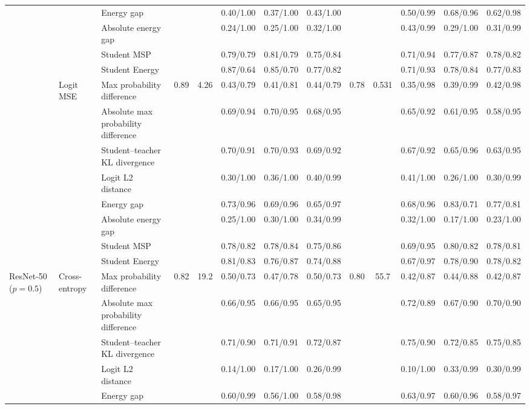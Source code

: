 \documentclass[border=2pt]{standalone}
\begin{document}
\begin{tabular}{lllcccccccccc}
 &  & Energy gap &  &  & 0.40/1.00 & 0.37/1.00 & 0.43/1.00 &  &  & 0.50/0.99 & 0.68/0.96 & 0.62/0.98 \\
 &  & Absolute energy gap &  &  & 0.24/1.00 & 0.25/1.00 & 0.32/1.00 &  &  & 0.43/0.99 & 0.29/1.00 & 0.31/0.99 \\
 &  & Student MSP &  &  & 0.79/0.79 & 0.81/0.79 & 0.75/0.84 &  &  & 0.71/0.94 & 0.77/0.87 & 0.78/0.82 \\
 &  & Student Energy &  &  & 0.87/0.64 & 0.85/0.70 & 0.77/0.82 &  &  & 0.71/0.93 & 0.78/0.84 & 0.77/0.83 \\
\addlinespace
 & Logit MSE & Max probability difference & 0.89 & 4.26 & 0.43/0.79 & 0.41/0.81 & 0.44/0.79 & 0.78 & 0.531 & 0.35/0.98 & 0.39/0.99 & 0.42/0.98 \\
 &  & Absolute max probability difference &  &  & 0.69/0.94 & 0.70/0.95 & 0.68/0.95 &  &  & 0.65/0.92 & 0.61/0.95 & 0.58/0.95 \\
 &  & Student--teacher KL divergence &  &  & 0.70/0.91 & 0.70/0.93 & 0.69/0.92 &  &  & 0.67/0.92 & 0.65/0.96 & 0.63/0.95 \\
 &  & Logit L2 distance &  &  & 0.30/1.00 & 0.36/1.00 & 0.40/0.99 &  &  & 0.41/1.00 & 0.26/1.00 & 0.30/0.99 \\
 &  & Energy gap &  &  & 0.73/0.96 & 0.69/0.96 & 0.65/0.97 &  &  & 0.68/0.96 & 0.83/0.71 & 0.77/0.81 \\
 &  & Absolute energy gap &  &  & 0.25/1.00 & 0.30/1.00 & 0.34/0.99 &  &  & 0.32/1.00 & 0.17/1.00 & 0.23/1.00 \\
 &  & Student MSP &  &  & 0.78/0.82 & 0.78/0.84 & 0.75/0.86 &  &  & 0.69/0.95 & 0.80/0.82 & 0.78/0.81 \\
 &  & Student Energy &  &  & 0.81/0.83 & 0.76/0.87 & 0.74/0.88 &  &  & 0.67/0.97 & 0.78/0.90 & 0.78/0.82 \\
\midrule
ResNet-50 ($p=0.5$) & Cross-entropy & Max probability difference & 0.82 & 19.2 & 0.50/0.73 & 0.47/0.78 & 0.50/0.73 & 0.80 & 55.7 & 0.42/0.87 & 0.44/0.88 & 0.42/0.87 \\
 &  & Absolute max probability difference &  &  & 0.66/0.95 & 0.66/0.95 & 0.65/0.95 &  &  & 0.72/0.89 & 0.67/0.90 & 0.70/0.90 \\
 &  & Student--teacher KL divergence &  &  & 0.71/0.90 & 0.71/0.91 & 0.72/0.87 &  &  & 0.75/0.90 & 0.72/0.85 & 0.75/0.85 \\
 &  & Logit L2 distance &  &  & 0.14/1.00 & 0.17/1.00 & 0.26/0.99 &  &  & 0.10/1.00 & 0.33/0.99 & 0.30/0.99 \\
 &  & Energy gap &  &  & 0.60/0.99 & 0.56/1.00 & 0.58/0.98 &  &  & 0.63/0.97 & 0.60/0.96 & 0.58/0.97 \\

\end{tabular}
\end{document}
